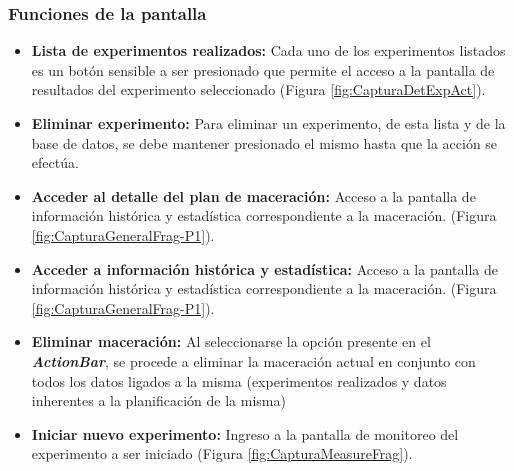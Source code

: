             \subsubsection{Funciones de la pantalla}
                \begin{itemize}
                    \item \textbf{Lista de experimentos realizados:} Cada uno de los experimentos listados es un botón sensible a ser presionado que permite el acceso a la pantalla de resultados del experimento seleccionado (Figura \ref{fig:CapturaDetExpAct}).
             
                    \item \textbf{Eliminar experimento:} Para eliminar un experimento, de esta lista y de la base de datos, se debe mantener presionado el mismo hasta que la acción se efectúa. 
           
                    \item \textbf{Acceder al detalle del plan de maceración:} Acceso a la pantalla de información histórica y estadística correspondiente a la maceración. (Figura \ref{fig:CapturaGeneralFrag-P1}).
                    
                    
                    \item \textbf{Acceder a información histórica y estadística:} Acceso a la pantalla de información histórica y estadística correspondiente a la maceración. (Figura \ref{fig:CapturaGeneralFrag-P1}).
                    
                    \item \textbf{Eliminar maceración:} Al seleccionarse la opción presente en el \textbf{\textit{\gls{ActionBar}}}, se procede a eliminar la maceración actual en conjunto con todos los datos ligados a la misma (experimentos realizados y datos inherentes a la planificación de la misma)
                    
                    \item \textbf{Iniciar nuevo experimento:} Ingreso a la pantalla de monitoreo del experimento a ser iniciado (Figura \ref{fig:CapturaMeasureFrag}).
                    
                \end{itemize}
                
